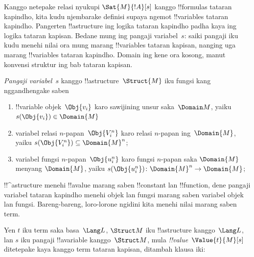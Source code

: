 \documentclass[../../../include/open-logic-section]{subfiles}
\begin{document}


\begin{explain}
Kanggo netepake relasi nyukupi $\Sat{M}{!A}[s]$ kanggo
!!{formula}s tataran kapindho, kita kudu njembarake definisi supaya
ngemot !!{variable}s tataran kapindho. Pangerten !!a{structure}
ing logika tataran kapindho padha kaya ing logika tataran kapisan.
Bedane mung ing pangaji variabel~$s$: saiki pangaji iku kudu
menehi nilai ora mung marang !!{variable}s tataran kapisan,
nanging uga marang !!{variable}s tataran kapindho. Domain ing kene ora kosong, manut konvensi struktur ing bab tataran kapisan.
\end{explain}

\begin{defn}
\emph{Pangaji variabel}~$s$ kanggo !!a{structure}~$\Struct{M}$
iku fungsi kang nggandhengake saben
\begin{enumerate}
\item !!{variable} objek~$\Obj{v_i}$ karo sawijining unsur
  saka~$\Domain M$, yaiku $s(\Obj{v_i}) \in \Domain{M}$
\item variabel relasi $n$-papan~$\Obj{V_i^n}$ karo relasi
  $n$-papan ing~$\Domain{M}$, yaiku
  $s(\Obj{V_i^n}) \subseteq \Domain{M}^n$;
\item variabel fungsi $n$-papan~$\Obj{u_i^n}$ karo fungsi
  $n$-papan saka $\Domain{M}$ menyang $\Domain{M}$, yaiku
  $s(\Obj{u_i^n})\colon \Domain{M}^n \to \Domain{M}$;
\end{enumerate}
\end{defn}

\begin{explain}
!!^a{structure} menehi !!a{value} marang saben !!{constant}
lan !!{function}, dene pangaji variabel tataran kapindho menehi objek
lan fungsi marang saben variabel objek lan fungsi. Bareng-bareng,
loro-lorone ngidini kita menehi nilai marang saben term.
\end{explain}

\begin{defn}
Yen $t$ iku term saka basa~$\Lang L$, $\Struct M$ iku
!!a{structure} kanggo~$\Lang L$, lan $s$ iku pangaji
!!a{variable} kanggo~$\Struct M$, mula \emph{!!{value}}~$\Value{t}{M}[s]$
ditetepake kaya kanggo term tataran kapisan, ditambah klausa iki:
\begin{quote}
\end{quote}
\end{defn}
\end{document}

